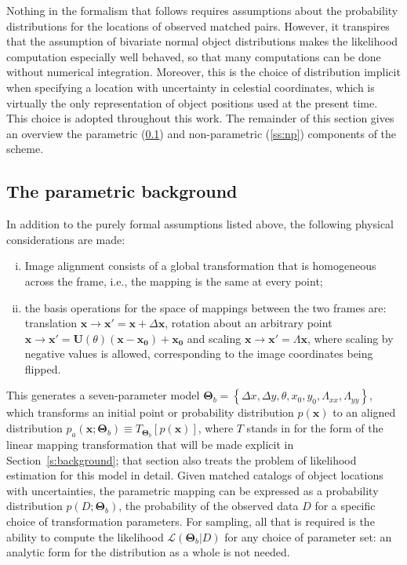 \documentclass[manuscript]{aastex}
\newcommand{\bsT}{\boldsymbol\Theta}
\begin{document}
Nothing in the formalism that follows requires assumptions about the probability distributions for the locations of observed matched pairs. However, it transpires that the assumption of bivariate normal object distributions makes the likelihood computation especially well behaved, so that many computations can be done without numerical integration. Moreover, this is the choice of distribution implicit when specifying a location with uncertainty in celestial coordinates, which is virtually the only representation of object positions used at the present time. This choice is adopted throughout this work. The remainder of this section gives an overview the parametric (\ref{ss:p}) and non-parametric (\ref{ss:np}) components of the scheme.

\subsection{The parametric background}\label{ss:p}
In addition to the purely formal assumptions listed above, the following physical considerations are made:
\begin{enumerate}[(i)]
\item Image alignment consists of a global transformation that is homogeneous across the frame, i.e., the mapping is the same at every point;
\item the basis operations for the space of mappings between the two frames are: translation $\mathbf{x}\rightarrow \mathbf{x}' = \mathbf{x}+\Delta\mathbf{x}$, rotation about an arbitrary point $\mathbf{x}\rightarrow \mathbf{x}' = \mathbf{U}(\theta)\left(\mathbf{x}-\mathbf{x_0}\right)+\mathbf{x_0}$ and scaling  $\mathbf{x}\rightarrow \mathbf{x}' = \Lambda\mathbf{x}$, where scaling by negative values is allowed, corresponding to the image coordinates being flipped.
\end{enumerate}
This generates a seven-parameter model $\bsT_b = \left\{\Delta x, \Delta y, \theta, x_0, y_0, \Lambda_{xx},\Lambda_{yy}\right\}$, which transforms an initial point or probability distribution $p(\mathbf{x})$ to an aligned distribution $p_a(\mathbf{x};\bsT_b) \equiv T_{\bsT_b}\left[p(\mathbf{x})\right]$, where $T$ stands in for the form of the linear mapping transformation that will be made explicit in Section~\ref{s:background}; that section also treats the problem of likelihood estimation for this model in detail. Given matched catalogs of object locations with uncertainties, the parametric mapping can be expressed as a probability distribution $p\left(D; \bsT_b\right)$, the probability of the observed data $D$ for a specific choice of transformation parameters. For sampling, all that is required is the ability to compute the likelihood $\mathcal{L}(\bsT_b|D)$ for any choice of parameter set: an analytic form for the distribution as a whole is not needed.
\end{document}
